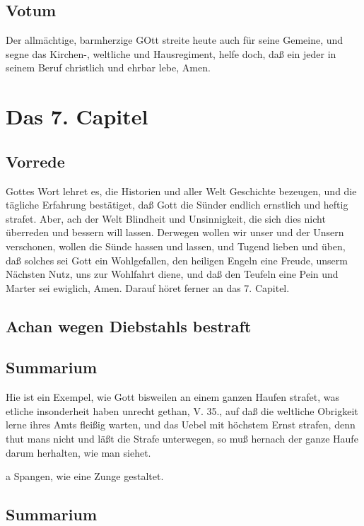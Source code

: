 \section{Votum}

Der allmächtige, barmherzige GOtt streite heute auch für seine Gemeine, und segne das Kirchen-, weltliche und Hausregiment, helfe doch, daß ein jeder in seinem Beruf christlich und ehrbar lebe, Amen.

\chapter{Das 7. Capitel}

\section{Vorrede}

Gottes Wort lehret es, die Historien und aller Welt Geschichte bezeugen, und die tägliche Erfahrung bestätiget, daß Gott die Sünder endlich ernstlich und heftig strafet. Aber, ach der Welt Blindheit und Unsinnigkeit, die sich dies nicht überreden und bessern will lassen. Derwegen wollen wir unser und der Unsern verschonen, wollen die Sünde hassen und lassen, und Tugend lieben und üben, daß solches sei Gott ein Wohlgefallen, den heiligen Engeln eine Freude, unserm Nächsten Nutz, uns zur Wohlfahrt diene, und daß den Teufeln eine Pein und Marter sei ewiglich, Amen. Darauf höret ferner an das 7. Capitel.

\section{Achan wegen Diebstahls bestraft}
\section{Summarium}

Hie ist ein Exempel, wie Gott bisweilen an einem ganzen Haufen strafet, was etliche insonderheit haben unrecht gethan, V. 35., auf daß die weltliche Obrigkeit lerne ihres Amts fleißig warten, und das Uebel mit höchstem Ernst strafen, denn thut mans nicht und läßt die Strafe unterwegen, so muß hernach der ganze Haufe darum herhalten, wie man siehet.

a Spangen, wie eine Zunge gestaltet.

\section{Summarium}

